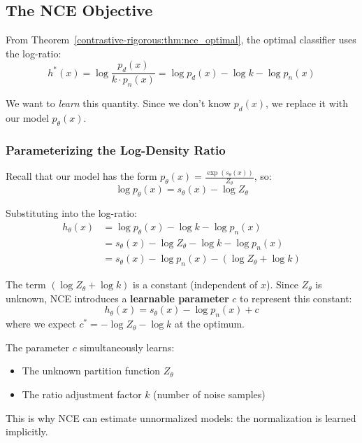 \begin{notechapter}
\subsection{The NCE Objective}

From Theorem~\ref{contrastive-rigorous:thm:nce_optimal}, the optimal classifier uses the log-ratio:
\begin{equation}
h^*(x) = \log \frac{p_d(x)}{k \cdot p_n(x)} = \log p_d(x) - \log k - \log p_n(x)
\end{equation}

We want to \emph{learn} this quantity. Since we don't know $p_d(x)$, we replace it with our model $p_\theta(x)$.

\subsubsection{Parameterizing the Log-Density Ratio}

Recall that our model has the form $p_\theta(x) = \frac{\exp(s_\theta(x))}{Z_\theta}$, so:
\begin{equation}
\log p_\theta(x) = s_\theta(x) - \log Z_\theta
\end{equation}

Substituting into the log-ratio:
\begin{align}
h_\theta(x) &= \log p_\theta(x) - \log k - \log p_n(x) \\
&= s_\theta(x) - \log Z_\theta - \log k - \log p_n(x) \\
&= s_\theta(x) - \log p_n(x) - (\log Z_\theta + \log k)
\end{align}

The term $(\log Z_\theta + \log k)$ is a constant (independent of $x$). Since $Z_\theta$ is unknown, NCE introduces a \textbf{learnable parameter} $c$ to represent this constant:
\begin{equation}
\boxed{h_\theta(x) = s_\theta(x) - \log p_n(x) + c}
\end{equation}
where we expect $c^* = -\log Z_\theta - \log k$ at the optimum.

\begin{remark}[Role of $c$]
The parameter $c$ simultaneously learns:
\begin{itemize}
    \item The unknown partition function $Z_\theta$
    \item The ratio adjustment factor $k$ (number of noise samples)
\end{itemize}
This is why NCE can estimate unnormalized models: the normalization is learned implicitly.
\end{remark}


\end{notechapter}
